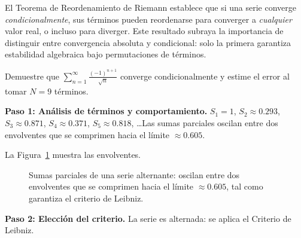 \begin{rem}
El Teorema de Reordenamiento de Riemann establece que si una serie converge
\emph{condicionalmente}, sus términos pueden reordenarse para converger a
\emph{cualquier} valor real, o incluso para diverger. Este resultado
subraya la importancia de distinguir entre convergencia absoluta y
condicional: solo la primera garantiza estabilidad algebraica bajo
permutaciones de términos.
\end{rem}

\begin{example} 
Demuestre que $\displaystyle\sum_{n=1}^\infty \frac{(-1)^{n+1}}{\sqrt{n}}$
converge condicionalmente y estime el error al tomar $N=9$ términos.
\begin{myproof}
\textbf{Paso 1: Análisis de términos y comportamiento.}
$S_1=1$, $S_2\approx 0.293$, $S_3\approx 0.871$, $S_4\approx 0.371$,
$S_5\approx 0.818$, \ldots Las sumas parciales oscilan entre dos
envolventes que se comprimen hacia el límite $\approx 0.605$.

La Figura~\ref{fig:serie_alternante_envolventes} muestra las envolventes.

\begin{figure}[H]
\centering
{}
\caption{Sumas parciales de una serie alternante: oscilan entre dos envolventes que se comprimen hacia el límite $\approx 0.605$, tal como garantiza el criterio de Leibniz.}
\label{fig:serie_alternante_envolventes}
\end{figure}

\textbf{Paso 2: Elección del criterio.}
La serie es alternada: se aplica el Criterio de Leibniz.


\end{myproof}
\end{example}
